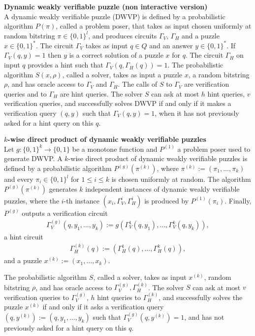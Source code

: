 \begin{definition} {\textbf{Dynamic weakly verifiable puzzle (non interactive version)}}\\
  A dynamic weakly verifiable puzzle (DWVP) is defined by a probabilistic algorithm $P(\pi)$,
  called a problem poser, that takes as input chosen uniformly at random bitstring $\pi \in \{0,1\}^l$,
  and produces circuits $\Gamma_{V}$, $\Gamma_{H}$ and a puzzle $x \in \{0,1\}^{*}$.
  The circuit $\Gamma_{V}$ takes as input $q \in Q$ and an answer $y \in \{0,1\}^*$.
  If $\Gamma_V(q,y) = 1$ then $y$ is a correct solution of a puzzle $x$ for $q$.
  The circuit $\Gamma_H$ on input $q$ provides a hint such that $\Gamma_V(q,\Gamma_H(q)) = 1$.
  The probabilistic algorithm $S(x, \rho)$, called a solver, takes as input a puzzle $x$, a random bitstring $\rho$,
  and has oracle access to $\Gamma_V$ and $\Gamma_H$.
  The calls of $S$ to $\Gamma_V$ are verification queries and to $\Gamma_H$ are hint queries.
  The solver $S$ can ask at most $h$ hint queries, $v$ verification queries, and successfully solves DWVP if and only if
  it makes a verification query $(q,y)$ such that $\Gamma_V(q,y) = 1$, when it has not previously asked for a hint query on this $q$.
\end{definition}
%
%
\begin{definition}{\textbf{$k$-wise direct product of dynamic weakly verifiable puzzles}}\\
Let $g: \{0,1\}^{k} \rightarrow \{0,1\}$ be a monotone function and $P^{(1)}$ a problem poser used to generate DWVP.
A $k$-wise direct product of dynamic weakly verifiable puzzles is defined by a probabilistic algorithm $P^{(g)}(\pi^{(k)})$,
where $\pi^{(k)} := (\pi_1, \dots, \pi_k)$ and every $\pi_i \in \{0,1\}^{l}$ for $1 \leq i \leq k$ is chosen uniformly at random.
The algorithm $P^{(g)}(\pi^{(k)})$ generates $k$ independent instances of dynamic weakly verifiable puzzles,
where the $i$-th instance $(x_i, \Gamma_V^{i}, \Gamma_H^{i} )$ is produced by $P^{(1)}(\pi_i)$.
Finally, $P^{(g)}$ outputs a verification circuit
\begin{align*}
  \Gamma_V^{(g)} (q, y_1, \dots, y_k) := g(\Gamma_V^{1}(q, y_1), \dots, \Gamma_V^{k}(q, y_k)),
\end{align*}
a hint circuit
\begin{align*}
  \Gamma_H^{(k)} (q) := (\Gamma_H^{1}(q), \dots, \Gamma_H^{k}(q)),
\end{align*}
and a puzzle $x^{(k)} := (x_1, \dots, x_k)$.

The probabilistic algorithm $S$, called a solver, takes as input $x^{(k)}$, random bitstring $\rho$, and has oracle access to $\Gamma_V^{(g)}, \Gamma_H^{(k)}$.
The solver $S$ can ask at most $v$ verification queries to $\Gamma_V^{(g)}$, $h$ hint queries to $\Gamma_H^{(k)}$, and successfully solves the puzzle $x^{(k)}$
if and only if it asks a verification query $(q, y^{(k)}) := (q, y_1, \dots, y_k)$ such that $\Gamma_V^{(g)}(q, y^{(k)}) = 1$, and has not previously asked for a hint query on this $q$.
\end{definition}
